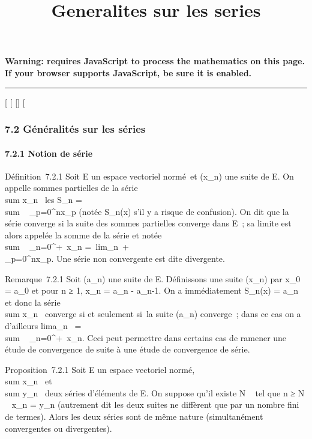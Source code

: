 \documentclass[]{article}
\title{Generalites sur les series}
\author{}
\date{}
\begin{document}
\maketitle

\textbf{Warning: 
requires JavaScript to process the mathematics on this page.\\ If your
browser supports JavaScript, be sure it is enabled.}

\begin{center}\rule{3in}{0.4pt}\end{center}

{[}
{[}
{[}{]}
{[}

\subsubsection{7.2 Généralités sur les séries}

\paragraph{7.2.1 Notion de série}

Définition~7.2.1 Soit E un espace vectoriel normé~et (x_n) une
suite de E. On appelle sommes partielles de la série
\\sum  x_n~ les
S_n = \\sum ~
_p=0^nx_p (notée S_n(x) s'il y a risque
de confusion). On dit que la série converge si la suite des sommes
partielles converge dans E~; sa limite est alors appelée la somme de la
série et notée \\sum ~
_n=0^+\infty~x_n =\
lim_n\rightarrow~+\infty~\\\sum
 _p=0^nx_p. Une série non convergente est
dite divergente.

Remarque~7.2.1 Soit (a_n) une suite de E. Définissons une suite
(x_n) par x_0 = a_0 et pour n ≥ 1,
x_n = a_n - a_n-1. On a immédiatement
S_n(x) = a_n et donc la série
\\sum  x_n~
converge si et seulement si~la suite (a_n) converge~; dans ce
cas on a d'ailleurs lima_n~
= \\sum ~
_n=0^+\infty~x_n. Ceci peut permettre dans certains cas
de ramener une étude de convergence de suite à une étude de convergence
de série.

Proposition~7.2.1 Soit E un espace vectoriel normé,
\\sum  x_n~ et
\\sum  y_n~ deux
séries d'éléments de E. On suppose qu'il existe N \in {}~ tel que n ≥ N \rigtharrow~
x_n = y_n (autrement dit les deux suites ne diffèrent
que par un nombre fini de termes). Alors les deux séries sont de même
nature (simultanément convergentes ou divergentes).
\end{document}
